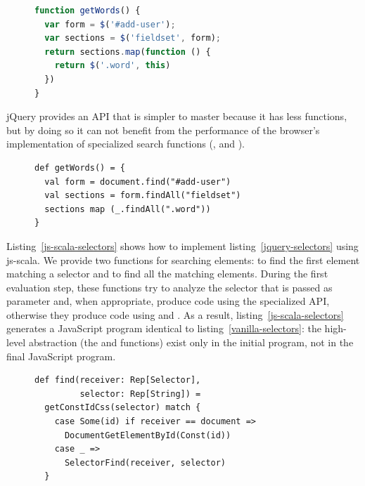 \documentclass[preprint]{sigplanconf}
\begin{document}
\begin{figure}
\begin{lstlisting}[language=JavaScript,label=jquery-selectors,caption=Searching elements in jQuery,captionpos=b]
function getWords() {
  var form = $('#add-user');
  var sections = $('fieldset', form);
  return sections.map(function () {
    return $('.word', this)
  })
}
\end{lstlisting}
\end{figure}

jQuery provides an API that is simpler to master because it has less functions, but by doing so it
can not benefit from the performance of the browser’s implementation of specialized search functions
(,  and ).

\begin{figure}
\begin{lstlisting}[label=js-scala-selectors,caption=Searching elements in js-scala,captionpos=b]
def getWords() = {
  val form = document.find("#add-user")
  val sections = form.findAll("fieldset")
  sections map (_.findAll(".word"))
}
\end{lstlisting}
\end{figure}

Listing~\ref{js-scala-selectors} shows how to implement listing~\ref{jquery-selectors} using
js-scala. We provide two functions for searching elements:  to find the first element
matching a selector and  to find all the matching elements. During the first
evaluation step, these functions try to analyze the selector that is passed as parameter and, when
appropriate, produce code using the specialized API, otherwise they produce  code using
 and . As a result, listing~\ref{js-scala-selectors}
generates a JavaScript program identical to listing~\ref{vanilla-selectors}: the high-level
abstraction (the  and  functions) exist only in the initial program, not in
the final JavaScript program.

\begin{figure}
\begin{lstlisting}[label=selector-impl,caption=Selectors optimization]
def find(receiver: Rep[Selector],
         selector: Rep[String]) =
  getConstIdCss(selector) match {
    case Some(id) if receiver == document =>
      DocumentGetElementById(Const(id))
    case _ =>
      SelectorFind(receiver, selector)
  }
\end{lstlisting}
\end{figure}
\end{document}
